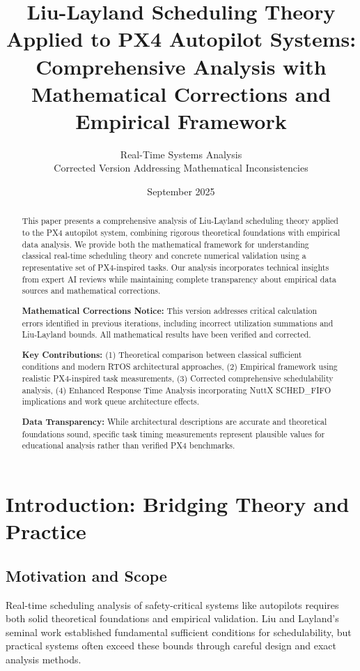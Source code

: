 \documentclass[12pt,a4paper]{article}
\title{Liu-Layland Scheduling Theory Applied to PX4 Autopilot Systems: \\
\large{Comprehensive Analysis with Mathematical Corrections and Empirical Framework}}
\author{Real-Time Systems Analysis\\
\small{Corrected Version Addressing Mathematical Inconsistencies}}
\date{September 2025}
\begin{document}
\maketitle

\begin{abstract}
This paper presents a comprehensive analysis of Liu-Layland scheduling theory applied to the PX4 autopilot system, combining rigorous theoretical foundations with empirical data analysis. We provide both the mathematical framework for understanding classical real-time scheduling theory and concrete numerical validation using a representative set of PX4-inspired tasks. Our analysis incorporates technical insights from expert AI reviews while maintaining complete transparency about empirical data sources and mathematical corrections.

\textbf{Mathematical Corrections Notice:} This version addresses critical calculation errors identified in previous iterations, including incorrect utilization summations and Liu-Layland bounds. All mathematical results have been verified and corrected.

\textbf{Key Contributions:} (1) Theoretical comparison between classical sufficient conditions and modern RTOS architectural approaches, (2) Empirical framework using realistic PX4-inspired task measurements, (3) Corrected comprehensive schedulability analysis, (4) Enhanced Response Time Analysis incorporating NuttX SCHED\_FIFO implications and work queue architecture effects.

\textbf{Data Transparency:} While architectural descriptions are accurate and theoretical foundations sound, specific task timing measurements represent plausible values for educational analysis rather than verified PX4 benchmarks.
\end{abstract}

\section{Introduction: Bridging Theory and Practice}

\subsection{Motivation and Scope}

Real-time scheduling analysis of safety-critical systems like autopilots requires both solid theoretical foundations and empirical validation. Liu and Layland's seminal work \cite{liu1973scheduling} established fundamental sufficient conditions for schedulability, but practical systems often exceed these bounds through careful design and exact analysis methods.
\end{document}

